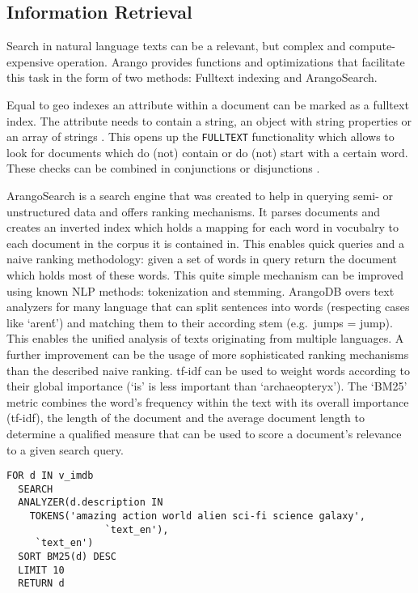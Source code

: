 \subsection{Information Retrieval}

Search in natural language texts can be a relevant, but complex and compute-expensive operation. Arango provides functions and optimizations that facilitate this task in the form of two methods: Fulltext indexing and ArangoSearch.

Equal to geo indexes an attribute within a document can be marked as a fulltext index. The attribute needs to contain a string, an object with string properties or an array of strings \parencite{FulltextIndex}. This opens up the \texttt{FULLTEXT} functionality which allows to look for documents which do (not) contain or do (not) start with a certain word. These checks can be combined in conjunctions or disjunctions \parencite{FulltextFunc}.

ArangoSearch is a search engine that was created to help in querying semi- or unstructured data and offers ranking mechanisms. It parses documents and creates an inverted index which holds a mapping for each word in vocubalry to each document in the corpus it is contained in. This enables quick queries and a naive ranking methodology: given a set of words in query return the document which holds most of these words.
This quite simple mechanism can be improved using known NLP methods: tokenization and stemming. ArangoDB overs text analyzers for many language that can split sentences into words (respecting cases like `aren\'t') and matching them to their according stem (e.g.\ jumps = jump). This enables the unified analysis of texts originating from multiple languages.
A further improvement can be the usage of more sophisticated ranking mechanisms than the described naive ranking. \gls{tf-idf} can be used to weight words according to their global importance (`is' is less important than `archaeopteryx').
The `BM25' metric combines the word's frequency within the text with its overall importance (\gls{tf-idf}), the length of the document and the average document length to determine a qualified measure that can be used to score a document's relevance to a given search query. \parencite{ArangoSearchTut}

\begin{lstlisting}[language=ArangoQL,caption={Searching a database of movie descriptions}]
FOR d IN v_imdb 
  SEARCH 
  ANALYZER(d.description IN 
    TOKENS('amazing action world alien sci-fi science galaxy', 
                 `text_en'),
     `text_en')
  SORT BM25(d) DESC 
  LIMIT 10 
  RETURN d
\end{lstlisting}

